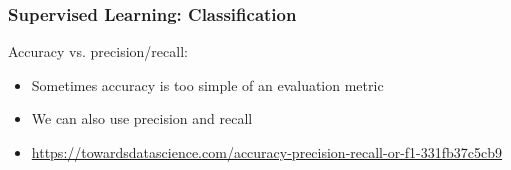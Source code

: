 \documentclass{beamer}
\begin{document}
\begin{frame}
	\frametitle{Supervised Learning: Classification}
	
	\begin{block}{Accuracy vs. precision/recall:}
		\begin{itemize}
			\item Sometimes accuracy is too simple of an evaluation metric
			\item We can also use precision and recall
			\item \url{https://towardsdatascience.com/accuracy-precision-recall-or-f1-331fb37c5cb9}
		\end{itemize}
	\end{block}

\end{frame}
\end{document}

